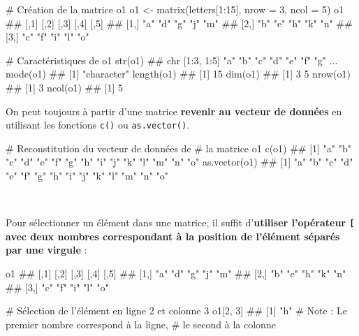 \documentclass[12pt,twosided, notitlepage]{book}
\newenvironment{Shaded}{}{}
\newcommand{\CommentTok}[1]{\textcolor[rgb]{0.00,0.50,0.00}{#1}}
\newcommand{\DataTypeTok}[1]{#1}
\newcommand{\DecValTok}[1]{#1}
\newcommand{\KeywordTok}[1]{\textcolor[rgb]{0.00,0.00,1.00}{#1}}
\newcommand{\NormalTok}[1]{#1}
\newcommand{\OperatorTok}[1]{#1}
\newcommand{\StringTok}[1]{\textcolor[rgb]{0.00,0.50,0.50}{#1}}
\renewenvironment{Shaded}{\begin{snugshade}}{\end{snugshade}}
\begin{document}
\begin{Shaded}
\begin{Highlighting}[]
\CommentTok{# Création de la matrice o1}
\NormalTok{o1 <-}\StringTok{ }\KeywordTok{matrix}\NormalTok{(letters[}\DecValTok{1}\OperatorTok{:}\DecValTok{15}\NormalTok{], }\DataTypeTok{nrow =} \DecValTok{3}\NormalTok{, }\DataTypeTok{ncol =} \DecValTok{5}\NormalTok{)}
\NormalTok{o1}
\NormalTok{  ##      [,1] [,2] [,3] [,4] [,5]}
\NormalTok{  ## [1,] "a"  "d"  "g"  "j"  "m" }
\NormalTok{  ## [2,] "b"  "e"  "h"  "k"  "n" }
\NormalTok{  ## [3,] "c"  "f"  "i"  "l"  "o"}

\CommentTok{# Caractéristiques de o1}
\KeywordTok{str}\NormalTok{(o1)}
\NormalTok{  ##  chr [1:3, 1:5] "a" "b" "c" "d" "e" "f" "g" ...}
\KeywordTok{mode}\NormalTok{(o1)}
\NormalTok{  ## [1] "character"}
\KeywordTok{length}\NormalTok{(o1)}
\NormalTok{  ## [1] 15}
\KeywordTok{dim}\NormalTok{(o1)}
\NormalTok{  ## [1] 3 5}
\KeywordTok{nrow}\NormalTok{(o1)}
\NormalTok{  ## [1] 3}
\KeywordTok{ncol}\NormalTok{(o1)}
\NormalTok{  ## [1] 5}
\end{Highlighting}
\end{Shaded}

On peut toujours à partir d'une matrice \textbf{revenir au vecteur de
données} en utilisant les fonctions \texttt{c()} ou
\texttt{as.vector()}.

\begin{Shaded}
\begin{Highlighting}[]
\CommentTok{# Reconstitution du vecteur de données de }
\CommentTok{# la matrice o1}
\KeywordTok{c}\NormalTok{(o1)}
\NormalTok{  ##  [1] "a" "b" "c" "d" "e" "f" "g" "h" "i" "j" "k" "l" "m" "n" "o"}
\KeywordTok{as.vector}\NormalTok{(o1)}
\NormalTok{  ##  [1] "a" "b" "c" "d" "e" "f" "g" "h" "i" "j" "k" "l" "m" "n" "o"}
\end{Highlighting}
\end{Shaded}

~

Pour sélectionner un élément dans une matrice, il suffit
d'\textbf{utiliser l'opérateur \texttt{{[}} avec deux nombres
correspondant à la position de l'élément séparés par une
virgule}\index{\texttt{[}|textbf} :

\begin{Shaded}
\begin{Highlighting}[]
\NormalTok{o1}
\NormalTok{  ##      [,1] [,2] [,3] [,4] [,5]}
\NormalTok{  ## [1,] "a"  "d"  "g"  "j"  "m" }
\NormalTok{  ## [2,] "b"  "e"  "h"  "k"  "n" }
\NormalTok{  ## [3,] "c"  "f"  "i"  "l"  "o"}

\CommentTok{# Sélection de l'élément en ligne 2 et colonne 3}
\NormalTok{o1[}\DecValTok{2}\NormalTok{, }\DecValTok{3}\NormalTok{]}
\NormalTok{  ## [1] "h"}
\CommentTok{# Note : Le premier nombre correspond à la ligne,}
\CommentTok{# le second à la colonne}
\end{Highlighting}
\end{Shaded}
\end{document}

